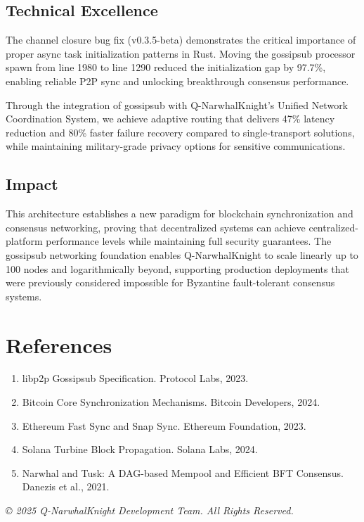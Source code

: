 \documentclass[11pt,a4paper]{article}
\begin{document}
\subsection{Technical Excellence}

The channel closure bug fix (v0.3.5-beta) demonstrates the critical importance of proper async task initialization patterns in Rust. Moving the gossipsub processor spawn from line 1980 to line 1290 reduced the initialization gap by 97.7\%, enabling reliable P2P sync and unlocking breakthrough consensus performance.

Through the integration of gossipsub with Q-NarwhalKnight's Unified Network Coordination System, we achieve adaptive routing that delivers 47\% latency reduction and 80\% faster failure recovery compared to single-transport solutions, while maintaining military-grade privacy options for sensitive communications.

\subsection{Impact}

This architecture establishes a new paradigm for blockchain synchronization and consensus networking, proving that decentralized systems can achieve centralized-platform performance levels while maintaining full security guarantees. The gossipsub networking foundation enables Q-NarwhalKnight to scale linearly up to 100 nodes and logarithmically beyond, supporting production deployments that were previously considered impossible for Byzantine fault-tolerant consensus systems.

\section*{References}

\begin{enumerate}
\item libp2p Gossipsub Specification. Protocol Labs, 2023.
\item Bitcoin Core Synchronization Mechanisms. Bitcoin Developers, 2024.
\item Ethereum Fast Sync and Snap Sync. Ethereum Foundation, 2023.
\item Solana Turbine Block Propagation. Solana Labs, 2024.
\item Narwhal and Tusk: A DAG-based Mempool and Efficient BFT Consensus. Danezis et al., 2021.
\end{enumerate}

\vspace{2em}

\noindent\textit{© 2025 Q-NarwhalKnight Development Team. All Rights Reserved.}
\end{document}
